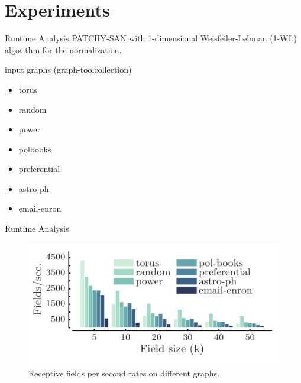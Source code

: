 \documentclass[dvipdfmx]{beamer}
\begin{document}
\section{Experiments}

  \begin{frame}{Runtime Analysis}
    PATCHY-SAN with 1-dimensional Weisfeiler-Lehman (1-WL) algorithm for the normalization.
    \vspace{5mm}

    \begin{block}{input graphs (graph-tool\footnotemark collection)}
      \begin{itemize}
        \item torus
        \item random
        \item power
        \item polbooks
        \item preferential
        \item astro-ph
        \item email-enron
      \end{itemize}
    \end{block}
  \end{frame}

  \begin{frame}{Runtime Analysis}
    \begin{figure}[h]
      \centering
      \includegraphics[width=0.8\paperwidth]{img/Fig4.pdf}
      \caption{Receptive fields per second rates on different graphs.}
    \end{figure} 
  \end{frame}
\end{document}
